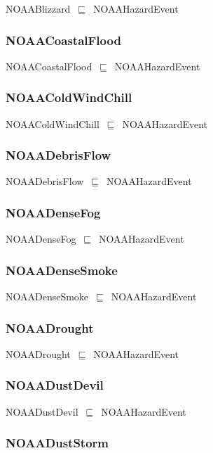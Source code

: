 \documentclass{article}
\begin{document}
NOAABlizzard~\ensuremath{\sqsubseteq}~NOAAHazardEvent~

\subsubsection*{NOAACoastalFlood}

NOAACoastalFlood~\ensuremath{\sqsubseteq}~NOAAHazardEvent~

\subsubsection*{NOAAColdWindChill}

NOAAColdWindChill~\ensuremath{\sqsubseteq}~NOAAHazardEvent~

\subsubsection*{NOAADebrisFlow}

NOAADebrisFlow~\ensuremath{\sqsubseteq}~NOAAHazardEvent~

\subsubsection*{NOAADenseFog}

NOAADenseFog~\ensuremath{\sqsubseteq}~NOAAHazardEvent~

\subsubsection*{NOAADenseSmoke}

NOAADenseSmoke~\ensuremath{\sqsubseteq}~NOAAHazardEvent~

\subsubsection*{NOAADrought}

NOAADrought~\ensuremath{\sqsubseteq}~NOAAHazardEvent~

\subsubsection*{NOAADustDevil}

NOAADustDevil~\ensuremath{\sqsubseteq}~NOAAHazardEvent~

\subsubsection*{NOAADustStorm}
\end{document}
